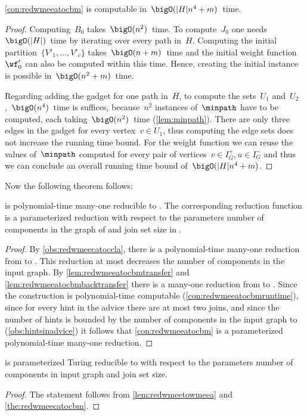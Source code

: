 \begin{lemma}
  \label{con:redwmeeatocbmruntime}
  \autoref{con:redwmeeatocbm} is computable in~$\bigO(|H|n^4 + m)$~time.
\end{lemma}
\begin{proof}
  Computing~$B_0$ takes~$\bigO(n^2)$~time. To compute~$J_0$ one needs~$\bigO(|H|)$~time by iterating over every path in~$H$. Computing the initial partition~$\{V'_1, \ldots,V'_c\}$ takes~$\bigO(n + m)$~time and the initial weight function~$\wf'_0$ can also be computed within this time. Hence, creating the initial instance is possible in~$\bigO(n^2 + m)$~time.
 
  Regarding adding the gadget for one path in~$H$, to compute the sets~$U_1$ and~$U_2$,~$\bigO(n^4)$~time is suffices, because~$n^2$ instances of~$\minpath$ have to be computed, each taking~$\bigO(n^2)$~time (\autoref{lem:minpath}). There are only three edges in the gadget for every vertex~$v \in U_1$, thus computing the edge sets does not increase the running time bound. For the weight function we can reuse the values of~$\minpath$ computed for every pair of vertices~$v \in I_G^+, u \in I_G^-$ and thus we can conclude an overall running time bound of~$\bigO(|H|n^4 + m)$.
\end{proof}
Now the following theorem follows:
\begin{theorem}\label{the:redwmeecatocbm}
  \pWMEECA{} is polynomial-time many-one reducible to \pCBM . The corresponding reduction function is a parameterized reduction with respect to the parameters number of components in the graph of \pWMEECAs{} and join set size in \pCBMs{}.
\end{theorem}
\begin{proof}
  By \autoref{obs:redwmeecatoccla}, there is a polynomial-time many-one reduction from \pWMEECAs{} to \pWMEECCLAs{}. This reduction at most decreases the number of components in the input graph. By \autoref{lem:redwmeeatocbmtransfer} and \autoref{lem:redwmeeatocbmbacktransfer} there is a many-one reduction from \pWMEECCLAs{} to \CBMs{} . Since the construction is polynomial-time computable (\autoref{con:redwmeeatocbmruntime}), since for every hint in the advice there are at most two joins, and since the number of hints is bounded by the number of components in the input graph to \pWMEECAs{} (\autoref{obs:hintsinadvice}) it follows that \autoref{con:redwmeeatocbm} is a parameterized polynomial-time many-one reduction.
\end{proof}
\begin{corollary}
  \pWMEE{} is parameterized Turing reducible to \pCBM{} with respect to the parameters number of components in input graph and join set size.
\end{corollary}
\begin{proof}
  The statement follows from \autoref{lem:redwmeetowmeea} and \autoref{the:redwmeecatocbm}.
\end{proof}

